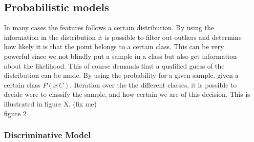 \subsection{Probabilistic models}
In many cases the features follows a certain distribution. By using the information in the distribution it is possible to filter out outliers and determine how likely it is that the point belongs to a certain class. This can be very powerful since we not blindly put a sample in a class but also get information about the likelihood. This of course demands that a qualified guess of the distribution can be made. 
By using the probability for a given sample, given a certain class $P(x|C)$. Iteration over the the different classes, it is possible to decide were to classify the sample, and how certain we are of this decision. This is illustrated in figure X. (fix me)\\

figure 2\\



\subsubsection{Discriminative Model}

